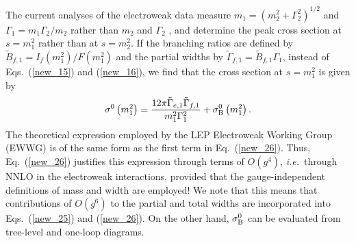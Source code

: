 \documentclass[a4paper,12pt]{article}
\begin{document}
The current analyses of the electroweak data measure
$m_1=\left(m^2_2+\Gamma_2^2\right)^{1/2}$ and $\Gamma_1=m_1\Gamma_2/m_2$
rather than $m_2$ and $\Gamma_2$ \cite{si_1}, and determine the peak cross
section at $s=m_1^2$ rather than at $s=m^2_2$.
If the branching ratios are defined by
$\tilde B_{f,1}=I_f\left(m^2_1\right)/F\left(m^2_1\right)$ and the partial
widths by $\tilde\Gamma_{f,1}=\tilde B_{f,1}\Gamma_1 $, instead of
Eqs.~(\ref{new_15}) and (\ref{new_16}), we find that the cross section at
$s=m_1^2$ is given by
\begin{equation}
\label{new_26}
\sigma^0\left(m^2_1\right)
=\frac{12\pi\tilde\Gamma_{e,1}\tilde\Gamma_{f,1}}{m^2_1\Gamma^2_1}
+\sigma_{\rm B}^0\left(m^2_1\right). 
\end{equation}
The theoretical expression employed by the LEP Electroweak Working Group
(EWWG) \cite{ewwg} is of the same form as the first term in
Eq.~(\ref{new_26}).
Thus, Eq.~(\ref{new_26}) justifies this expression through terms of $O(g^4)$,
{\it i.e.}\ through NNLO in the electroweak interactions, 
provided that the gauge-independent definitions of
mass and width are employed!
We note that this means that contributions of $O(g^6)$ to the partial and
total widths are incorporated into Eqs.~(\ref{new_25}) and (\ref{new_26}).
On the other hand, $\sigma_{\rm B}^0$ can be evaluated from tree-level and
one-loop diagrams.
\end{document}
